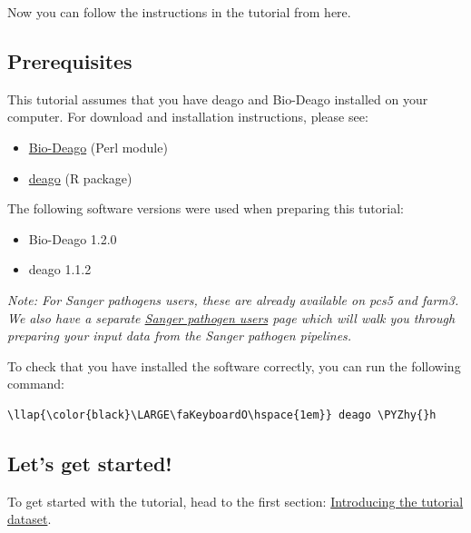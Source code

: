 \documentclass[11pt]{article}
\providecommand{\tightlist}{%
      \setlength{\itemsep}{0pt}\setlength{\parskip}{0pt}}
\def\PYZhy{\char`\-}
\begin{document}
Now you can follow the instructions in the tutorial from here.

\hypertarget{prerequisites}{%
\subsection{Prerequisites}\label{prerequisites}}

This tutorial assumes that you have deago and Bio-Deago installed on
your computer. For download and installation instructions, please see:

\begin{itemize}
\tightlist
\item
  \href{https://github.com/sanger-pathogens/Bio-Deago}{Bio-Deago} (Perl
  module)
\item
  \href{https://github.com/sanger-pathogens/deago}{deago} (R package)
\end{itemize}

The following software versions were used when preparing this tutorial:

\begin{itemize}
\tightlist
\item
  Bio-Deago 1.2.0
\item
  deago 1.1.2
\end{itemize}

\textit{Note: For Sanger pathogens users, these are already available on
pcs5 and farm3. We also have a separate
\href{Sanger-pathogen-users.ipynb}{Sanger pathogen users} page which
will walk you through preparing your input data from the Sanger pathogen
pipelines.}

To check that you have installed the software correctly, you can run the
following command:

\begin{terminalinput}
\begin{Verbatim}[commandchars=\\\{\}]
\llap{\color{black}\LARGE\faKeyboardO\hspace{1em}} deago \PYZhy{}h
\end{Verbatim}
\end{terminalinput}

    \hypertarget{lets-get-started}{%
\subsection{Let's get started!}\label{lets-get-started}}

To get started with the tutorial, head to the first section:
\href{introduction.ipynb}{Introducing the tutorial dataset}.
\end{document}
